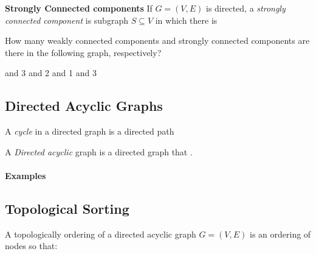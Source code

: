 \documentclass[11  pt]{exam}
\begin{document}
	
	\textbf{Strongly Connected components} If $G = (V,E)$ is directed, a \emph{strongly connected component} is subgraph $S \subseteq V$ in which there is  \\ %
	\vfill 
	
	\newpage
	
	\begin{Qu}
		How many weakly connected components and strongly connected components are there in the following graph, respectively?
		
		\begin{itemize}
			 and 3
			 and 2
			 and 1
			 and 3
		\end{itemize}
		
	\end{Qu}
	
	
	\vs{3cm}
	
	\subsection{Directed Acyclic Graphs}
	A \emph{cycle} in a directed graph is a directed path  \\ %
	
	\vs{2cm}
	
	
	A \emph{Directed acyclic} graph is a directed graph that .
	
	
	\paragraph{Examples}
	
	
	
	\newpage
	
	
	\subsection{Topological Sorting}
	A topologically ordering of a directed acyclic graph $G = (V,E)$ is an ordering of nodes so that: \\
	
	
	
	
\end{document}
